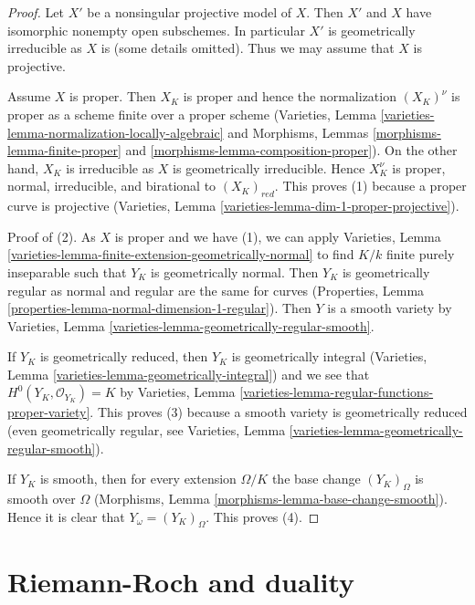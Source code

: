 \begin{proof}
Let $X'$ be a nonsingular projective model of $X$. Then $X'$ and
$X$ have isomorphic nonempty open subschemes. In particular
$X'$ is geometrically irreducible as $X$ is (some details omitted).
Thus we may assume that $X$ is projective.

\medskip\noindent
Assume $X$ is proper. Then $X_K$ is proper and hence the normalization
$(X_K)^\nu$ is proper as a scheme finite over a proper scheme
(Varieties, Lemma \ref{varieties-lemma-normalization-locally-algebraic}
and Morphisms, Lemmas \ref{morphisms-lemma-finite-proper} and
\ref{morphisms-lemma-composition-proper}).
On the other hand, $X_K$ is irreducible as $X$ is geometrically
irreducible. Hence $X_K^\nu$ is proper, normal, irreducible, and birational
to $(X_K)_{red}$. This proves (1) because a proper curve is projective
(Varieties, Lemma \ref{varieties-lemma-dim-1-proper-projective}).

\medskip\noindent
Proof of (2). As $X$ is proper and we have (1), we can apply
Varieties, Lemma \ref{varieties-lemma-finite-extension-geometrically-normal}
to find $K/k$ finite purely inseparable such that
$Y_K$ is geometrically normal. Then $Y_K$ is geometrically regular
as normal and regular are the same for curves
(Properties, Lemma \ref{properties-lemma-normal-dimension-1-regular}).
Then $Y$ is a smooth variety by
Varieties, Lemma \ref{varieties-lemma-geometrically-regular-smooth}.

\medskip\noindent
If $Y_K$ is geometrically reduced, then $Y_K$ is geometrically
integral (Varieties, Lemma \ref{varieties-lemma-geometrically-integral})
and we see that $H^0(Y_K, \mathcal{O}_{Y_K}) = K$ by
Varieties, Lemma \ref{varieties-lemma-regular-functions-proper-variety}.
This proves (3) because a smooth variety is geometrically reduced
(even geometrically regular, see
Varieties, Lemma \ref{varieties-lemma-geometrically-regular-smooth}).

\medskip\noindent
If $Y_K$ is smooth, then for every extension $\Omega/K$
the base change $(Y_K)_\Omega$ is smooth over $\Omega$
(Morphisms, Lemma \ref{morphisms-lemma-base-change-smooth}).
Hence it is clear that $Y_\omega = (Y_K)_\Omega$. This proves (4).
\end{proof}






\section{Riemann-Roch and duality}
\label{section-Riemann-Roch}

